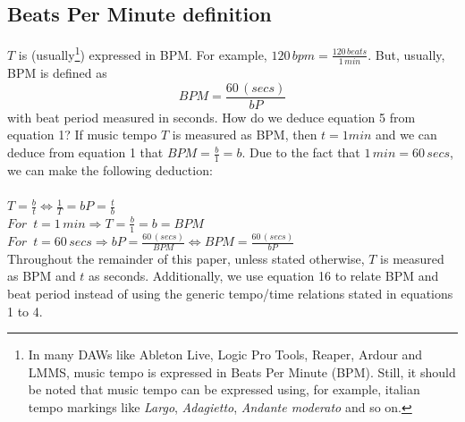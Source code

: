 \documentclass{sig-alternate}
\begin{document}
\subsection{Beats Per Minute definition}
$T$ is (usually\footnote{In many DAWs like Ableton Live, Logic Pro Tools, Reaper, Ardour and LMMS, music tempo is expressed in Beats Per Minute (BPM). Still, it should be noted that music tempo can be expressed using, for example, italian tempo markings like \textit{Largo}, \textit{Adagietto}, \textit{Andante moderato} and so on.}) expressed in BPM. For example, $120\,bpm = \frac{120\,beats}{1\,min}$. But, usually, BPM is defined as 
\begin{equation}
BPM = \frac{60\,(secs)}{bP}
\end{equation}
with beat period measured in seconds. How do we deduce equation 5 from equation 1? If music tempo $T$ is measured as BPM, then $t=1 min$ and we can deduce from equation 1 that $ BPM = \frac{b}{1} = b$. Due to the fact that $1\,min=60\,secs$, we can make the following deduction:\\\\
$ T = \frac{b}{t} \Leftrightarrow \frac{1}{T} = bP = \frac{t}{b} $\\
$For\,\,\,t = 1\,min \Rightarrow T = \frac{b}{1} = b = BPM$\\
$For\,\,\,t = 60\,secs \Rightarrow bP = \frac{60\,(secs)}{BPM} \Leftrightarrow BPM = \frac{60\,(secs)}{bP}$\\
Throughout the remainder of this paper, unless stated otherwise, $T$ is measured as BPM and $t$ as seconds. Additionally, we use equation 16 to relate BPM and beat period instead of using the generic tempo/time relations stated in equations 1 to 4.
\end{document}
